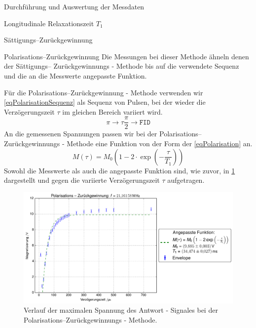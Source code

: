 \documentclass[pdftex, a4paper,11pt, twoside, ngerman]{report}
\begin{document}
\begin{chapter}{Durchführung und Auswertung der Messdaten}
\begin{section}{
        Longitudinale Relaxationszeit $T_{1}$}
\begin{subsection}{Sättigungs--Zurückgewinnung}
      \end{subsection}
      
      
      
      \begin{subsection}{Polarisations--Zurückgewinnung}
        \label{chpLongRelaxPolarisation}
        Die Messungen bei dieser Methode ähneln denen der Sättigungs--
        Zurückgewinnungs - Methode bis auf die verwendete Sequenz und die an die
        Messwerte angepasste Funktion.
        
        Für die Polarisations--Zurückgewinnung - Methode verwenden wir
        \cref{eqPolarisationSequenz} als Sequenz von Pulsen, bei der wieder die
        Verzögerungszeit $\tau$ im gleichen Bereich variiert wird.
        \begin{equation}
          \label{eqPolarisationSequenz}
          \pi \rightarrow \tau \frac{\pi}{2} \rightarrow \mathtt{FID}
        \end{equation} 
        An die gemessenen Spannungen passen wir bei der Polarisations--
        Zurückgewinnungs - Methode eine Funktion von der Form der
        \cref{eqPolarisation} an.
        \begin{equation}
          \label{eqPolarisation}
          M(\tau)=M_{0}\left(1-2\cdot\exp\left(-\frac{\tau}{T_{1}}\right)\right)
        \end{equation} 
        Sowohl die Messwerte als auch die angepasste Funktion sind, wie zuvor,
        in \cref{figPolarisation} dargestellt und gegen die variierte
        Verzögerungszeit $\tau$ aufgetragen.
        \begin{figure}[htb]
          \centering
          \includegraphics[width=\textwidth]
          {Figures/PolarisationsZurueckgewinnung.png}
          \caption{Verlauf der maximalen Spannung des Antwort - Signales bei der
            Polarisations--Zurückgewinnungs - Methode.}
          \label{figPolarisation}
        \end{figure}
        

\end{subsection}
\end{section}
\end{chapter}
\end{document}
